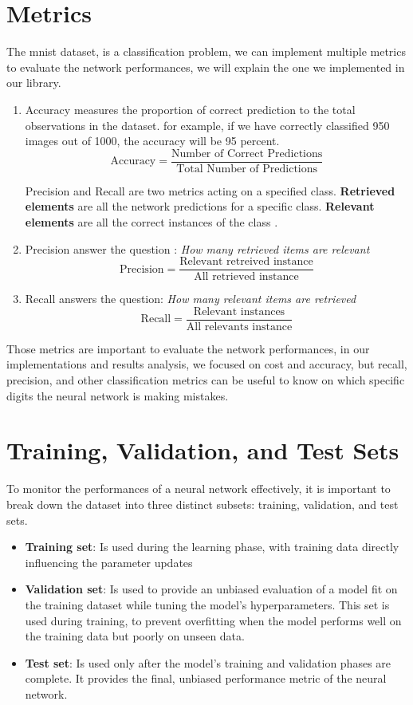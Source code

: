 \documentclass[a4paper, twocolumn, twoside]{article}
\begin{document}
	\section{Metrics}
	The mnist dataset, is a classification problem, we can implement multiple metrics
	to evaluate the network performances, we will explain the one we implemented in our library.

	\begin{enumerate}
		\item Accuracy measures the proportion of correct prediction to the total observations in the dataset.
		for example, if we have correctly classified 950 images out of 1000, the accuracy will be 95 percent.
		$$
		\text{Accuracy} = \frac{\text{Number of Correct Predictions}}{\text{Total Number of Predictions}}
		$$

		Precision and Recall are two metrics acting on a specified class.
		\textbf{Retrieved elements} are all the network predictions for a specific class.
		\textbf{Relevant elements} are all the correct instances of 
		the class \cite{wiki_precision_recall}.

		\item Precision answer the question : \textit{How many retrieved items are relevant}
		$$
		\text{Precision} = \frac{\text{Relevant retreived instance}}{\text{All retrieved instance}}
		$$
		\item Recall answers the question: \textit{How many relevant items are retrieved}
		$$
		\text{Recall} = \frac{\text{Relevant instances}}{\text{All relevants instance}}
		$$
	\end{enumerate}

        Those metrics are important to evaluate the network performances, in our implementations and results analysis, we focused on cost and accuracy, but recall, precision, and other classification metrics
        can be useful to know on which specific digits the neural network is making mistakes.

	\section{Training, Validation, and Test Sets}
	To monitor the performances of a neural network effectively,
	it is important to break down the dataset into three distinct subsets:
	training, validation, and test sets.

	\begin{itemize}
        \item{\textbf{Training set}}: Is used during the learning phase,
        with training data directly influencing the parameter updates
        \item{\textbf{Validation set}}: Is used to provide an unbiased evaluation of a model fit
        on the training dataset while tuning the model's hyperparameters.
        This set is used during training, to prevent overfitting when the model performs well on the training data
        but poorly on unseen data.
        \item{\textbf{Test set}}: Is used only after the model's training and validation phases are complete.
	It provides the final, unbiased performance metric of the neural network.
	\end{itemize}
\end{document}
